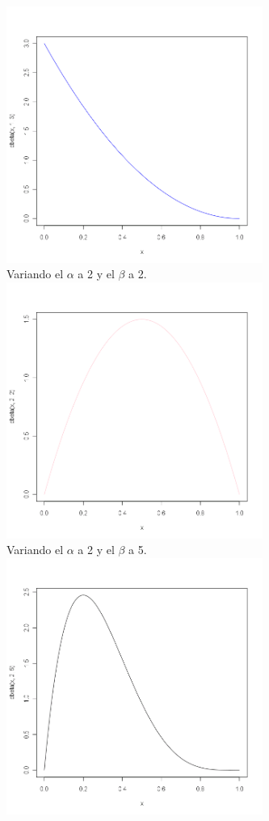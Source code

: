 \begin{itemize}
  	  \includegraphics[width=3.3in,height=3.3in]{images/2_4-dbeta13.png}\\
	Variando el $\alpha$ a 2 y el $\beta$ a 2.\\
  	  \includegraphics[width=3.3in,height=3.3in]{images/2_4-dbeta22.png}\\
	Variando el $\alpha$ a 2 y el $\beta$ a 5.\\
  	  \includegraphics[width=3.3in,height=3.3in]{images/2_4-dbeta25.png}\\


\end{itemize}
